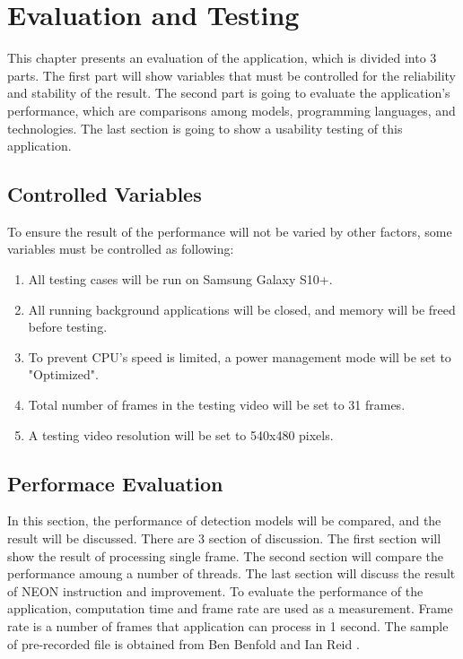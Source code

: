 \chapter{Evaluation and Testing}\label{testing}

    This chapter presents an evaluation of the application, which is divided into 3 parts.
    The first part will show variables that must be controlled for the reliability and stability of the result.
    The second part is going to evaluate the application's performance,
    which are comparisons among models, programming languages, and technologies.
    The last section is going to show a usability testing of this application.

    \section{Controlled Variables}
        To ensure the result of the performance will not be varied by other factors, some variables must be controlled as following:
        \begin{enumerate}
            \item All testing cases will be run on Samsung Galaxy S10+.
            \item All running background applications will be closed, and memory will be freed before testing.
            \item To prevent CPU's speed is limited, a power management mode will be set to "Optimized".
            \item Total number of frames in the testing video will be set to 31 frames.
            \item A testing video resolution will be set to 540x480 pixels.
        \end{enumerate}

    \section{Performace Evaluation}
        In this section, the performance of detection models will be compared, and the result will be discussed.
        There are 3 section of discussion. The first section will show the result of processing single frame.
        The second section will compare the performance amoung a number of threads.
        The last section will discuss the result of NEON instruction and improvement.
        To evaluate the performance of the application, computation time and frame rate are used as a measurement.
        Frame rate is a number of frames that application can process in 1 second.
        The sample of pre-recorded file is obtained from Ben Benfold and Ian Reid \cite{benfold2009attention}.

